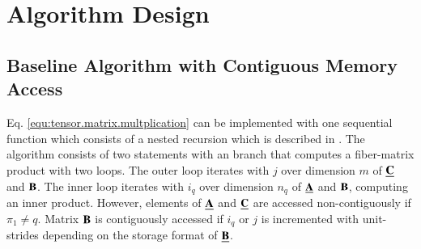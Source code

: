 \section{Algorithm Design}
\label{sec:design}






\subsection{Baseline Algorithm with Contiguous Memory Access}
\label{sec:design:modified.baseline.algorithm}
Eq. \ref{equ:tensor.matrix.multplication} can be implemented with one sequential  function which  consists of a nested recursion which is described in \cite{bassoy:2018:fast}.
The algorithm consists of two  statements with an  branch that computes a fiber-matrix product with two loops.
The outer loop iterates with $j$ over dimension $m$ of $\underline{\mathbf{C}}$ and $\mathbf{B}$.
The inner loop iterates with $i_q$ over dimension $n_q$ of $\underline{\mathbf{A}}$ and $\mathbf{B}$, computing an inner product. 
However, elements of $\underline{\mathbf{A}}$ and $\underline{\mathbf{C}}$ are accessed non-contiguously if $\pi_1 \neq q$.
Matrix $\mathbf{B}$ is contiguously accessed if $i_q$ or $j$ is incremented with unit-strides depending on the storage format of $\underline{\mathbf{B}}$.


